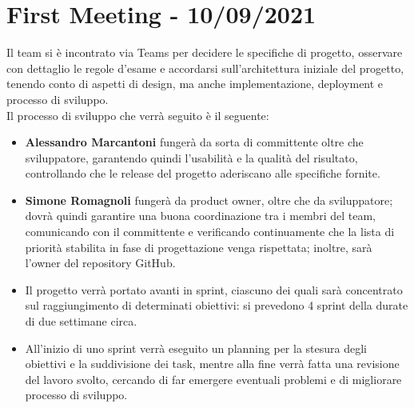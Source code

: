 \section*{First Meeting - 10/09/2021}
Il team si è incontrato via Teams per decidere le specifiche di progetto, osservare con dettaglio le regole d'esame e
accordarsi sull'architettura iniziale del progetto, tenendo conto di aspetti di design, ma anche implementazione,
deployment e processo di sviluppo.\\
Il processo di sviluppo che verrà seguito è il seguente:
\begin{itemize}
    \item \textbf{Alessandro Marcantoni} fungerà da sorta di committente oltre che sviluppatore, garantendo quindi l'usabilità e la qualità del risultato, controllando che le release del progetto aderiscano alle specifiche fornite.
    \item \textbf{Simone Romagnoli} fungerà da product owner, oltre che da sviluppatore; dovrà quindi garantire una buona coordinazione tra i membri del team, comunicando con il committente e verificando continuamente che la lista di priorità stabilita in fase di progettazione venga rispettata; inoltre, sarà l'owner del repository GitHub.
    \item Il progetto verrà portato avanti in sprint, ciascuno dei quali sarà concentrato sul raggiungimento di determinati obiettivi: si prevedono 4 sprint della durate di due settimane circa.
    \item All'inizio di uno sprint verrà eseguito un planning per la stesura degli obiettivi e la suddivisione dei task, mentre alla fine verrà fatta una revisione del lavoro svolto, cercando di far emergere eventuali problemi e di migliorare processo di sviluppo.
\end{itemize}

\newpage